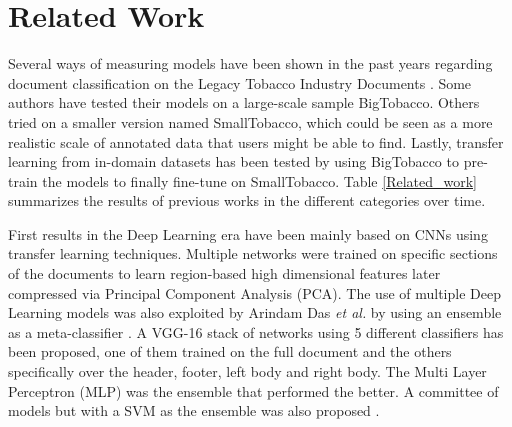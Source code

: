 \documentclass[runningheads]{llncs}
\begin{document}
\section{Related Work}

Several ways of measuring models have been shown in the past years regarding document classification on the Legacy Tobacco Industry Documents \cite{tobacco_initial}. Some authors have tested their models on a large-scale sample BigTobacco. Others tried on a smaller version named SmallTobacco, which could be seen as a more realistic scale of annotated data that users might be able to find. Lastly, transfer learning from in-domain datasets has been tested by using BigTobacco to pre-train the models to finally fine-tune on SmallTobacco. Table \ref{Related_work} summarizes the results of previous works in the different categories over time.

First results in the Deep Learning era have been mainly based on CNNs using transfer learning techniques. Multiple networks were trained on specific sections of the documents \cite{BigTobacco} to learn region-based high dimensional features later compressed via Principal Component Analysis (PCA). The use of multiple Deep Learning models was also exploited by Arindam Das \textit{et al.} by using an ensemble as a meta-classifier \cite{intra_domain}. A VGG-16\cite{VGG16} stack of networks using 5 different classifiers has been proposed, one of them trained on the full document and the others specifically over the header, footer, left body and right body. The Multi Layer Perceptron (MLP) was the ensemble that performed the better. A committee of models but with a SVM as the ensemble was also proposed \cite{Roy}.
\end{document}
